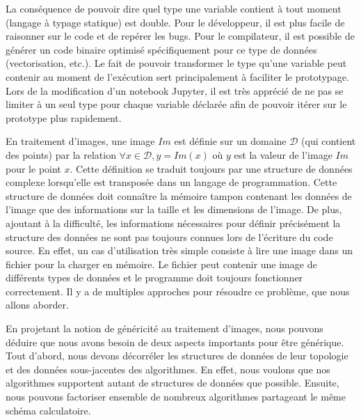 La conséquence de pouvoir dire quel type une variable contient à tout moment (langage à typage statique) est double.
Pour le développeur, il est plus facile de raisonner sur le code et de repérer les bugs. Pour le compilateur, il est
possible de générer un code binaire optimisé spécifiquement pour ce type de données (vectorisation, etc.). Le fait de
pouvoir transformer le type qu'une variable peut contenir au moment de l'exécution sert principalement à faciliter le
prototypage. Lors de la modification d'un notebook Jupyter, il est très apprécié de ne pas se limiter à un seul type
pour chaque variable déclarée afin de pouvoir itérer sur le prototype plus rapidement.

En traitement d'images, une image \(Im\) est définie sur un domaine \(\mathcal{D}\) (qui contient des points) par la
relation \(\forall x \in \mathcal{D}, y = Im(x)\) où \(y\) est la valeur de l'image \(Im\) pour le point \(x\). Cette
définition se traduit toujours par une structure de données complexe lorsqu'elle est transposée dans un langage de
programmation. Cette structure de données doit connaître la mémoire tampon contenant les données de l'image que
des informations sur la taille et les dimensions de l'image. De plus, ajoutant à la difficulté, les informations
nécessaires pour définir précisément la structure des données ne sont pas toujours connues lors de l'écriture du code
source. En effet, un cas d'utilisation très simple consiste à lire une image dans un fichier pour la charger en mémoire.
Le fichier peut contenir une image de différents types de données et le programme doit toujours fonctionner
correctement. Il y a de multiples approches pour résoudre ce problème, que nous allons aborder.

En projetant la notion de généricité au traitement d'images, nous pouvons déduire que nous avons besoin de deux aspects
importants pour être générique. Tout d'abord, nous devons décorréler les structures de données de leur topologie et des
données sous-jacentes des algorithmes. En effet, nous voulons que nos algorithmes supportent autant de structures de
données que possible. Ensuite, nous pouvons factoriser ensemble de nombreux algorithmes partageant le même schéma
calculatoire.

